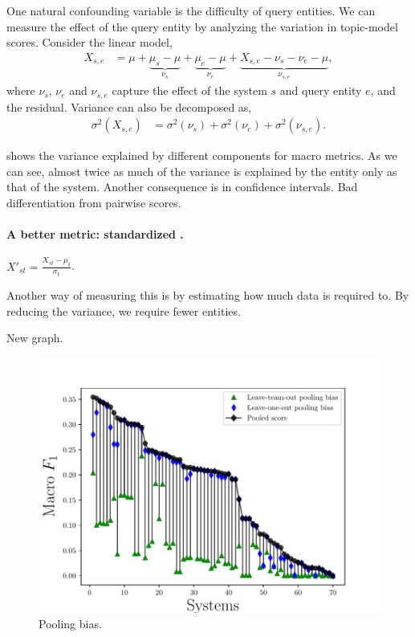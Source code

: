 One natural confounding variable is the difficulty of query entities.
We can measure the effect of the query entity by analyzing the variation in topic-model scores.
Consider the linear model,
\begin{align*}
  X_{s,e} &= \mu 
    + \underbrace{\mu_{s} - \mu}_{\nu_{s}}
    + \underbrace{\mu_{e} - \mu}_{\nu_{e}}
    + \underbrace{X_{s,e} - \nu_{s} - \nu_{e} - \mu}_{\nu_{s,e}},
\end{align*}
where $\nu_{s}$, $\nu_{e}$ and $\nu_{s,e}$ capture the effect of the system $s$ and query entity $e$, and the residual.
Variance can also be decomposed as,
\begin{align*}
  \sigma^2(X_{s,e}) &= \sigma^2(\nu_s) + \sigma^2(\nu_e) + \sigma^2(\nu_{s,e}).
\end{align*}

\tableref{} shows the variance explained by different components for macro metrics. As we can see, almost twice as much of the variance is explained by the entity only as that of the system.
Another consequence is in confidence intervals.
Bad differentiation from pairwise scores.

\paragraph{A better metric: standardized \fone.}

$X'_{st} = \frac{X_{st} - \mu_t}{\sigma_t}$.

Another way of measuring this is by estimating how much data is required to. By reducing the variance, we require fewer entities. 

New graph.


\begin{figure}
  \includegraphics[width=\columnwidth]{figures/experiment2}
  \caption{Pooling bias.}
\end{figure}


